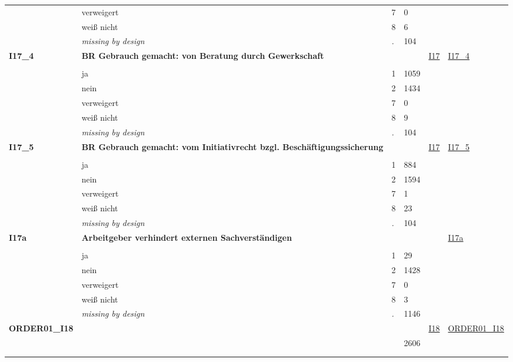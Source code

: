 \begin{longtable}{| L{2.45cm} | L{6cm} | C{1.5cm} | R{1cm} | C{2.25cm} | C{2.25cm} |}
   & verweigert & 7 & 0 &  &  \\ 
   & weiß nicht & 8 & 6 &  &  \\ 
   & \textit{missing by design} & \textit{.} & 104 &  &  \\ 
   \midrule
\textbf{I17\_4}\label{var:I17:4} & \textbf{BR Gebrauch gemacht: von Beratung durch Gewerkschaft} &  &  & \hyperref[I17]{I17} & \hyperref[var:suf:I17:4]{I17\_4} \\ 
   &  &  &  &  &  \\ 
   & ja & 1 & 1059 &  &  \\ 
   & nein & 2 & 1434 &  &  \\ 
   & verweigert & 7 & 0 &  &  \\ 
   & weiß nicht & 8 & 9 &  &  \\ 
   & \textit{missing by design} & \textit{.} & 104 &  &  \\ 
   \midrule
\textbf{I17\_5}\label{var:I17:5} & \textbf{BR Gebrauch gemacht: vom Initiativrecht bzgl. Beschäftigungssicherung} &  &  & \hyperref[I17]{I17} & \hyperref[var:suf:I17:5]{I17\_5} \\ 
   &  &  &  &  &  \\ 
   & ja & 1 & 884 &  &  \\ 
   & nein & 2 & 1594 &  &  \\ 
   & verweigert & 7 & 1 &  &  \\ 
   & weiß nicht & 8 & 23 &  &  \\ 
   & \textit{missing by design} & \textit{.} & 104 &  &  \\ 
   \midrule
\textbf{I17a}\label{var:I17a} & \textbf{Arbeitgeber verhindert externen Sachverständigen} &  &  &  & \hyperref[var:suf:I17a]{I17a} \\ 
   &  &  &  &  &  \\ 
   & ja & 1 & 29 &  &  \\ 
   & nein & 2 & 1428 &  &  \\ 
   & verweigert & 7 & 0 &  &  \\ 
   & weiß nicht & 8 & 3 &  &  \\ 
   & \textit{missing by design} & \textit{.} & 1146 &  &  \\ 
   \midrule
\textbf{ORDER01\_I18}\label{var:ORDER01:I18} & \textbf{} &  &  & \hyperref[I18]{I18} & \hyperref[var:suf:ORDER01:I18]{ORDER01\_I18} \\ 
   & \protect\subsection[Variablen ORDER01\_I18 bis I20b]{} &  & 2606 &  &  \\ 

\end{longtable}
